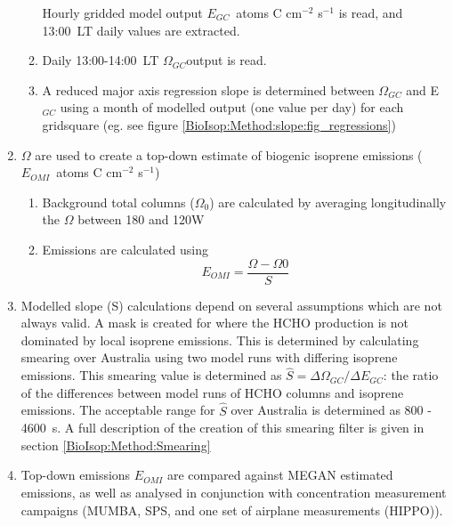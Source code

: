 \begin{enumerate}
\begin{enumerate}
            Hourly gridded model output $E_{GC}$~atoms C cm$^{-2}$ s$^{-1}$ is read, and 13:00~LT daily values are extracted.
          \item
            Daily 13:00-14:00~LT $\Omega_{GC}$\moleccm output is read.
          \item 
            A reduced major axis regression slope is determined between $\Omega_{GC}$ and E$_{GC}$ using a month of modelled output (one value per day) for each gridsquare (eg. see figure \ref{BioIsop:Method:slope:fig_regressions})
        \end{enumerate}
      \item 
        $\Omega$ are used to create a top-down estimate of biogenic isoprene emissions ($E_{OMI}$~atoms C cm$^{-2}$ s$^{-1}$)
      \begin{enumerate}
        \item 
          Background total columns ($\Omega_{0}$) are calculated by averaging longitudinally the $\Omega$ between 180 and 120\degr W
        \item
          Emissions are calculated using 
          \begin{equation} \label{BioIsop:Method:eqn_Enew}
            E_{OMI} = \frac{\Omega - \Omega{0}}{S}
          \end{equation}
      \end{enumerate}
      \item
        Modelled slope (S) calculations depend on several assumptions which are not always valid.
        A mask is created for where the HCHO production is not dominated by local isoprene emissions. 
        This is determined by calculating smearing over Australia using two model runs with differing isoprene emissions.
        This smearing value is determined as $\hat{S}=\Delta \Omega_{GC}/ \Delta E_{GC}$: the ratio of the differences between model runs of HCHO columns and isoprene emissions.
        The acceptable range for $\hat{S}$ over Australia is determined as 800 - 4600~s.
        A full description of the creation of this smearing filter is given in section \ref{BioIsop:Method:Smearing}
      \item 
        Top-down emissions $E_{OMI}$ are compared against MEGAN estimated emissions, as well as analysed in conjunction with concentration measurement campaigns (MUMBA, SPS, and one set of airplane measurements (HIPPO)).

\end{enumerate}
